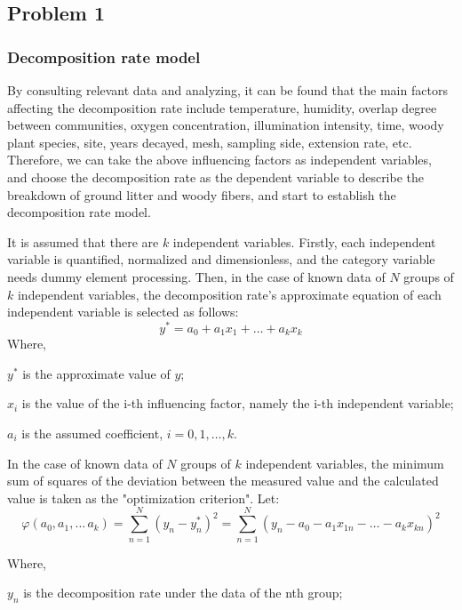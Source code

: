 \subsection{Problem 1}
\subsubsection{Decomposition rate model}

By consulting relevant data and analyzing, it can be found that the main factors affecting the decomposition rate include temperature, humidity, overlap degree between communities, oxygen concentration, illumination intensity, time, woody plant species, site, years decayed, mesh, sampling side, extension rate, etc. Therefore, we can take the above influencing factors as independent variables, and choose the decomposition rate as the dependent variable to describe the breakdown of ground litter and woody fibers, and start to establish the decomposition rate model.

It is assumed that there are $k$ independent variables. Firstly, each independent variable is quantified, normalized and dimensionless, and the category variable needs dummy element processing. Then, in the case of known data of $N$ groups of $k$ independent variables, the decomposition rate's approximate equation of each independent variable is selected as follows:
\begin{equation}\label{1.1}
    y^{*}=a_{0}+a_{1}x_{1}+\dots+a_{k}x_{k}
\end{equation}
Where,

$y^{*}$ is the approximate value of $y$;

$x_{i}$ is the value of the i-th influencing factor, namely the i-th independent variable;

$a_{i}$ is the assumed coefficient, $i=0, 1, \dots, k$.

In the case of known data of $N$ groups of $k$ independent variables, the minimum sum of squares of the deviation between the measured value and the calculated value is taken as the "optimization criterion". Let:
\begin{equation}\label{1.2}
    \varphi(a_{0},a_{1},\dots\,a_{k})=\sum_{n = 1}^{N}(y_{n}-y_{n}^{*})^{2}=\sum_{n = 1}^{N} (y_{n}-a_{0}-a_{1}x_{1n}-\dots-a_{k}x_{kn})^{2}
\end{equation}

Where,

$y_{n}$ is the decomposition rate under the data of the nth group;

